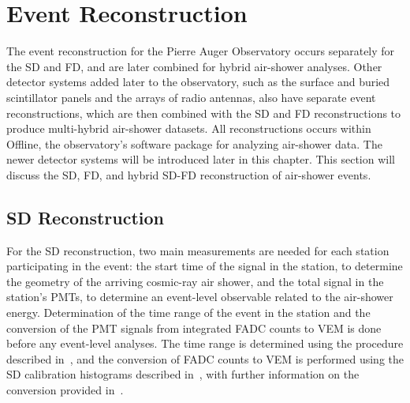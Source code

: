  





\section{Event Reconstruction}\label{sec:reconstruction}

The event reconstruction for the Pierre Auger Observatory occurs separately for the SD and FD, and are later combined for hybrid air-shower analyses.
Other detector systems added later to the observatory, such as the surface and buried scintillator panels and the arrays of radio antennas, also have separate event reconstructions, which are then combined with the SD and FD reconstructions to produce multi-hybrid air-shower datasets.
All reconstructions occurs within Offline, the observatory's software package for analyzing air-shower data.
The newer detector systems will be introduced later in this chapter.
This section will discuss the SD, FD, and hybrid SD-FD reconstruction of air-shower events.



\subsection{SD Reconstruction}\label{ssec:sd_reconstruction}
For the SD reconstruction, two main measurements are needed for each station participating in the event: the start time of the signal in the station, to determine the geometry of the arriving cosmic-ray air shower, and the total signal in the station's PMTs, to determine an event-level observable related to the air-shower energy.
Determination of the time range of the event in the station and the conversion of the PMT signals from integrated FADC counts to VEM is done before any event-level analyses.
The time range is determined using the procedure described in~\cite{auger_jinst2020_sdreconstruction}, and the conversion of FADC counts to VEM is performed using the SD calibration histograms described in~, with further information on the conversion provided in~\cite{auger_nima2006_sdcalibration}.

